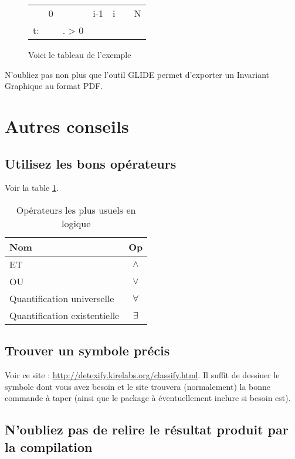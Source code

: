 \begin{figure}[!h]
\centering
\begin{tabular}{l|llr|ll|l}
 & 0 &  & \multicolumn{1}{r|}{i-1} & i &  & N \\ \cline{2-6}
t: & \cellcolor[HTML]{FFCC67} & \cellcolor[HTML]{FFCC67}. > 0 & \cellcolor[HTML]{FFCC67} &  &  &  \\ \cline{2-6}
\end{tabular}
\caption{Voici le tableau de l'exemple}
\label{fig:exemple}
\end{figure}

N'oubliez pas non plus que l'outil GLIDE permet d'exporter un Invariant Graphique au format PDF.

\section{Autres conseils}

\subsection{Utilisez les bons opérateurs}

Voir la table \ref{table:op}.

\begin{table}[!h]
\centering
\begin{tabular}{l c}
Nom & Op \\
\hline
ET & $\land$ \\
OU & $\lor$ \\
Quantification universelle & $\forall$ \\
Quantification existentielle & $\exists$ \\
\end{tabular}
\caption{Opérateurs les plus usuels en logique}
\label{table:op}
\end{table}

\subsection{Trouver un symbole précis}

Voir ce site : \url{http://detexify.kirelabs.org/classify.html}. Il suffit de dessiner le symbole dont vous avez besoin et le site trouvera (normalement) la bonne commande à taper (ainsi que le package à éventuellement inclure si besoin est).

\subsection{N'oubliez pas de relire le résultat produit par la compilation}


